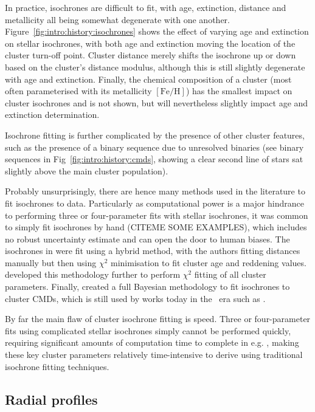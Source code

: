 In practice, isochrones are difficult to fit, with age, extinction, distance and metallicity all being somewhat degenerate with one another. Figure~\ref{fig:intro:history:isochrones} shows the effect of varying age and extinction on stellar isochrones, with both age and extinction moving the location of the cluster turn-off point. Cluster distance merely shifts the isochrone up or down based on the cluster's distance modulus, although this is still slightly degenerate with age and extinction. Finally, the chemical composition of a cluster (most often parameterised with its metallicity $\left[\text{Fe}/\text{H}\right]$) has the smallest impact on cluster isochrones and is not shown, but will nevertheless slightly impact age and extinction determination.

Isochrone fitting is further complicated by the presence of other cluster features, such as the presence of a binary sequence due to unresolved binaries (see binary sequences in Fig~\ref{fig:intro:history:cmds}, showing a clear second line of stars sat slightly above the main cluster population).

Probably unsurprisingly, there are hence many methods used in the literature to fit isochrones to data. Particularly as computational power is a major hindrance to performing three or four-parameter fits with stellar isochrones, it was common to simply fit isochrones by hand (CITEME SOME EXAMPLES), which includes no robust uncertainty estimate and can open the door to human biases. The isochrones in \cite{kharchenko_global_2013} were fit using a hybrid method, with the authors fitting distances manually but then using $\chi^2$ minimisation to fit cluster age and reddening values. \cite{yen_reanalysis_2018} developed this methodology further to perform $\chi^2$ fitting of all cluster parameters. Finally, \cite{hippel_inverting_2006} created a full Bayesian methodology to fit isochrones to cluster CMDs, which is still used by works today in the \gaia\ era such as \cite{bossini_age_2019}.

By far the main flaw of cluster isochrone fitting is speed. Three or four-parameter fits using complicated stellar isochrones simply cannot be performed quickly, requiring significant amounts of computation time to complete in e.g. \cite{yen_reanalysis_2018}, making these key cluster parameters relatively time-intensive to derive using traditional isochrone fitting techniques.


\subsection{Radial profiles}
\label{sec:intro:theory:profile}


